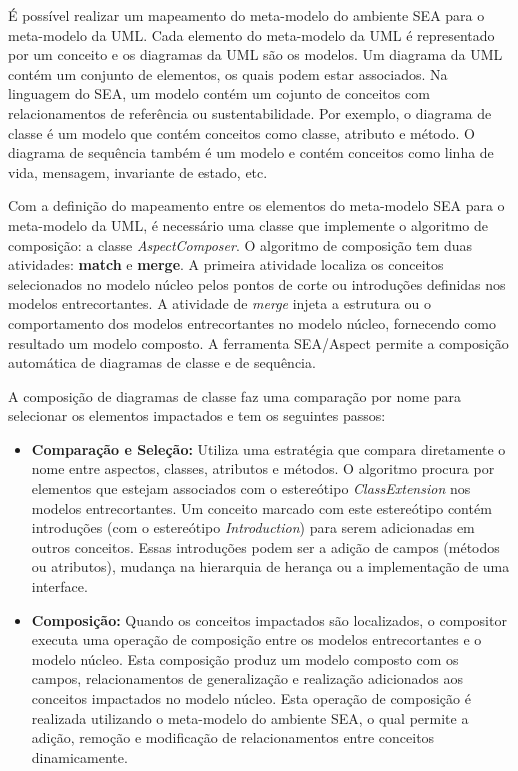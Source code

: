 É possível realizar um mapeamento do meta-modelo do ambiente SEA para o meta-modelo da UML. Cada elemento do meta-modelo da UML é representado por um
conceito e os diagramas da UML são os modelos. Um diagrama da UML contém um conjunto de elementos, os quais podem estar associados. Na linguagem do
SEA, um modelo contém um cojunto de conceitos com relacionamentos de referência ou sustentabilidade. Por exemplo, o diagrama de classe é um modelo que
contém conceitos como classe, atributo e método. O diagrama de sequência também é um modelo e contém conceitos como linha de vida, mensagem,
invariante de estado, etc.
  
Com a definição do mapeamento entre os elementos do meta-modelo SEA para o meta-modelo da UML, é necessário uma classe que implemente o algoritmo de
composição: a classe \textit{AspectComposer}. O algoritmo de composição tem duas atividades: \textbf{match} e \textbf{merge}. A primeira atividade
localiza os conceitos selecionados no modelo núcleo pelos pontos de corte ou introduções definidas nos modelos entrecortantes. A atividade de \textit{merge} 
injeta a estrutura ou o comportamento dos modelos entrecortantes no modelo núcleo, fornecendo como resultado um modelo composto. A ferramenta
SEA/Aspect permite a composição automática de diagramas de classe e de sequência.

A composição de diagramas de classe faz uma comparação por nome para selecionar os elementos impactados e tem os seguintes passos:
  
\begin{itemize}
  
	\item \textbf{Comparação e Seleção:} Utiliza uma estratégia que compara diretamente o nome entre aspectos, classes, atributos e métodos. O algoritmo
	procura por elementos que estejam associados com o estereótipo \textit{ClassExtension} nos modelos entrecortantes. Um conceito marcado com este
	estereótipo contém introduções (com o estereótipo \textit{Introduction}) para serem adicionadas em outros conceitos. Essas introduções podem ser a
	adição de campos (métodos ou atributos), mudança na hierarquia de herança ou a implementação de uma interface. 
	
	\item \textbf{Composição:} Quando os conceitos impactados são localizados, o compositor executa uma operação de composição entre os modelos
	entrecortantes e o modelo núcleo. Esta composição produz um modelo composto com os campos, relacionamentos de generalização e realização
	adicionados aos conceitos impactados no modelo núcleo. Esta operação de composição é realizada utilizando o meta-modelo do ambiente SEA, o qual
	permite a adição, remoção e modificação de relacionamentos entre conceitos dinamicamente.

\end{itemize}


